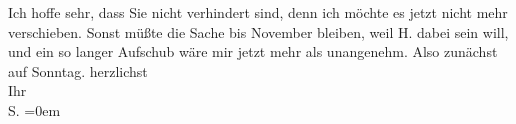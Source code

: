 \begin{ledgroupsized}[t]{13cm}
               Ich hoffe sehr, dass Sie nicht verhindert sind, denn ich möchte es jetzt nicht mehr
               verschieben. Sonst müßte die Sache bis November bleiben, weil H. dabei sein will, und ein so langer Aufschub wäre mir jetzt
               mehr als unangenehm. \pend
           \pstart
           Also zunächst auf Sonntag.\pend
           \pstart
           herzlichst {\\[\baselineskip]}Ihr {\\[\baselineskip]}\spacefill\mbox{S.}\pend
           \leftskip=0em{}
         
         \endnumbering{}\end{ledgroupsized}\begin{anhang}\end{anhang}\newcommand{\dateiname}{L03350}\newcommand{\titel}{Felix Salten an Arthur Schnitzler, [23./24.? 10. 1903]}\newcommand{\editorInnen}{Martin Anton Müller und Laura Untner}
      